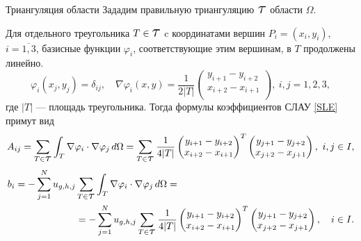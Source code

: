 \documentclass[ignoreonframetext,xcolor=table, unicode, 10pt]{beamer}
\renewcommand{\phi}{\varphi}
\newcommand\Tau{\scalerel*{\tau}{T}}
\begin{document}
\begin{frame}{Триангуляция области}
	Зададим правильную триангуляцию $\Tau$ области $\Omega$.
	
	Для отдельного треугольника $T \in \Tau$ c координатами вершин $P_i = (x_i, y_i),$ $i=\overline{1,3}$, базисные функции $\phi_i$, соответствующие этим вершинам, в $T$ продолжены линейно.
	\begin{equation*}
		\phi_i(x_j, y_j) = \delta_{ij}, \quad 
		\nabla \phi_{i}(x,y) = \dfrac{1}{2 |T|} 
		\begin{pmatrix}
			y_{i+1} - y_{i+2} \\
			x_{i+2} - x_{i+1} \\
		\end{pmatrix}, \ i,j = 1,2,3,
	\end{equation*}
	где $|T|$ --- площадь треугольника. Тогда формулы коэффициентов СЛАУ \eqref{SLE} примут вид	
	\begin{equation*}
		A_{ij} = \sum_{T \in \Tau}\int_{T} \nabla \phi_i \cdot \nabla \phi_j \, d\Omega 
		= \sum_{T \in \Tau} \dfrac{1}{4 |T|} 
		\begin{pmatrix}
			y_{i+1} - y_{i+2}\\
			x_{i+2} - x_{i+1}\\
		\end{pmatrix}^T
		\begin{pmatrix}
			y_{j+1} - y_{j+2}\\
			x_{j+2} - x_{j+1}\\
		\end{pmatrix},
		\  i, j\in I,
	\end{equation*}
	\begin{equation*}
		\begin{aligned}
			b_i = - \sum_{j=1}^{N} u_{g,h, j} & \sum_{T \in \Tau} \int_{T} \nabla \phi_i  \cdot \nabla \phi_j \, d\Omega = \\
			& = - \sum_{j=1}^{N} u_{g,h, j}  \sum_{T \in \Tau} \dfrac{1}{4 |T|} 
			\begin{pmatrix}
				y_{i+1} - y_{i+2}\\
				x_{i+2} - x_{i+1}\\
			\end{pmatrix}^T
			\begin{pmatrix}
				y_{j+1} - y_{j+2}\\
				x_{j+2} - x_{j+1}\\
			\end{pmatrix},
			\quad i \in I.
		\end{aligned}		
	\end{equation*}
	\normalsize
\end{frame}
\end{document}

